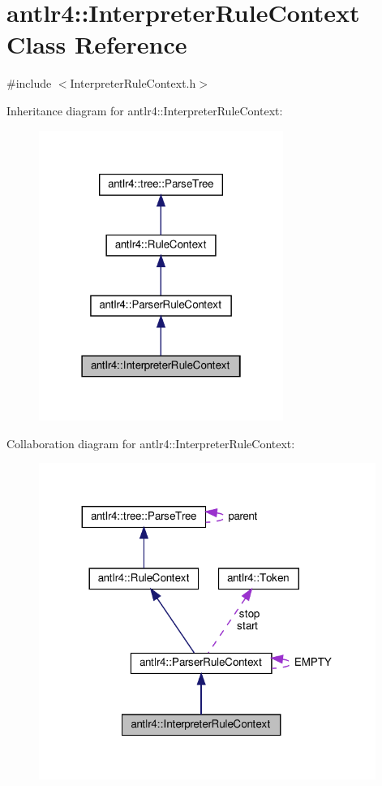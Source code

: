 \hypertarget{classantlr4_1_1InterpreterRuleContext}{}\section{antlr4\+:\+:Interpreter\+Rule\+Context Class Reference}
\label{classantlr4_1_1InterpreterRuleContext}


{\ttfamily \#include $<$Interpreter\+Rule\+Context.\+h$>$}



Inheritance diagram for antlr4\+:\+:Interpreter\+Rule\+Context\+:
\nopagebreak
\begin{figure}[H]
\begin{center}
\leavevmode
\includegraphics[width=226pt]{classantlr4_1_1InterpreterRuleContext__inherit__graph}
\end{center}
\end{figure}


Collaboration diagram for antlr4\+:\+:Interpreter\+Rule\+Context\+:
\nopagebreak
\begin{figure}[H]
\begin{center}
\leavevmode
\includegraphics[width=311pt]{classantlr4_1_1InterpreterRuleContext__coll__graph}
\end{center}
\end{figure}
